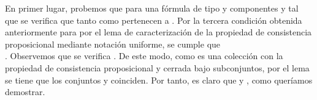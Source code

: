 \begin{isabellebody}
\begin{isamarkuptext}
\begin{demostracion}
    En primer lugar, probemos que para una fórmula  de tipo \isa{{\isasymalpha}} y componentes  y  tal que 
     se verifica que tanto  como  pertenecen a . Por la tercera condición 
    obtenida anteriormente para  por el lema de caracterización de la propiedad de consistencia 
    proposicional mediante notación uniforme, se cumple que\\ . Observemos que
    se verifica . De este modo, como  es una colección con la propiedad de 
    consistencia proposicional y cerrada bajo subconjuntos, por el lema  se tiene que 
    los conjuntos  y  coinciden. Por tanto, es claro que  y , 
    como queríamos demostrar.


\end{demostracion}
\end{isamarkuptext}
\end{isabellebody}
